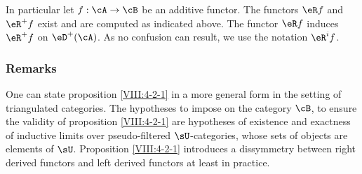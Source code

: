 In particular let $f:\cA\to \cB$ be an additive functor. The functors
$\eR f$ and $\eR^+ f$ exist and are computed as indicated
above. The functor $\eR f$ induces $\eR^+ f$ on $\eD^+(\cA)$.
As no confusion can result, we
use the notation $\eR^i f$. 





\subsubsection{Remarks}\label{VIII:4-2-2}

One can state proposition \ref{VIII:4-2-1} in a more
general form in the setting of triangulated categories. The hypotheses
to impose on the category $\cB$, to ensure the validity of
proposition \ref{VIII:4-2-1} are hypotheses of existence and exactness
of inductive limits over pseudo-filtered $\sU$-categories, whose
sets of objects are elements of $\sU$. Proposition
\ref{VIII:4-2-1} introduces a dissymmetry between right derived functors
and left derived functors at least in practice. 





